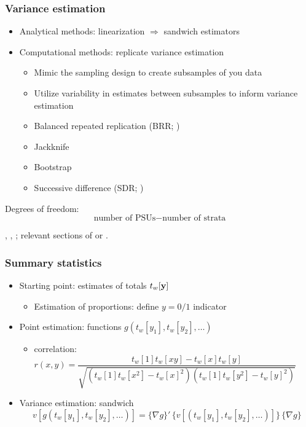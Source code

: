 \documentclass[handout]{beamer}
\begin{document}
\begin{frame}\frametitle{Variance estimation}

\begin{itemize}
    \item Analytical methods: linearization $\Rightarrow$ sandwich estimators
    \item Computational methods: replicate variance estimation
    \begin{itemize}
        \item Mimic the sampling design to create subsamples of you data
        \item Utilize variability in estimates between subsamples to inform variance estimation
        \item Balanced repeated replication (BRR; \citet{mccarthy:1969})
        \item Jackknife \citep{krewski:rao:1981}
        \item Bootstrap \citep{rao:wu:1988,sitter:1992:3bs}
        \item Successive difference (SDR; \citet{ash:2011})
    \end{itemize}
\end{itemize}

Degrees of freedom:
$$
\mbox{number of PSUs} - \mbox{number of strata}
$$ 
 
\citet{shao:1996}, \citet{rust:rao:1996}, \citet{kolenikov:2010}; 
relevant sections of \citet{heeringa:west:berglund:2017} or \citet{lumley:2010}.

\end{frame}


\begin{frame}\frametitle{Summary statistics}

\begin{itemize}
    \item Starting point: estimates of totals $t_w[{\bf y}]$
        \begin{itemize} \item Estimation of proportions: define $y=0/1$ indicator \end{itemize}
    \item Point estimation: functions $g(t_w[y_1], t_w[y_2], \ldots)$
        \begin{itemize}
            \item correlation: $r(x,y) = \dfrac{t_w[1]t_w[xy]-t_w[x]t_w[y]}%
                {\sqrt{(t_w[1]t_w[x^2]-t_w[x]^2)(t_w[1]t_w[y^2]-t_w[y]^2)}}$
        \end{itemize}
    \item Variance estimation: sandwich
        $$
            v[g(t_w[y_1], t_w[y_2], \ldots)] = \{\nabla g\}' \, \{ v[(t_w[y_1], t_w[y_2], \ldots)] \} \, \{\nabla g \}
        $$
\end{itemize}

\end{frame}
\end{document}
